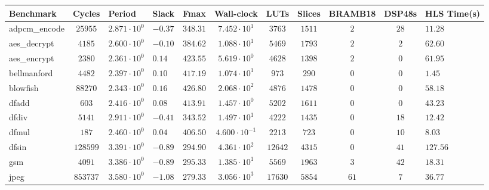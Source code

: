 \begin{tabular}{|l|c|HHc|c|c|c|c|cH|}
\hline
Benchmark     & Cycles       & Period                 & Slack     & Fmax       & Wall-clock              & LUTs      & Slices    & BRAMB18 & DSP48s  & HLS Time(s) \\
\hline
adpcm\_encode & $ 25955    $ & $ 2.871 \cdot 10^{0} $ & $ -0.37 $ & $ 348.31 $ & $ 7.452 \cdot 10^{1}  $ & $ 3763  $ & $ 1511  $ & $ 2   $ & $ 28  $ & $ 11.28   $ \\
aes\_decrypt  & $ 4185     $ & $ 2.600 \cdot 10^{0} $ & $ -0.10 $ & $ 384.62 $ & $ 1.088 \cdot 10^{1}  $ & $ 5469  $ & $ 1793  $ & $ 2   $ & $ 2   $ & $ 62.60   $ \\
aes\_encrypt  & $ 2380     $ & $ 2.361 \cdot 10^{0} $ & $ 0.14  $ & $ 423.55 $ & $ 5.619 \cdot 10^{0}  $ & $ 4628  $ & $ 1398  $ & $ 2   $ & $ 0   $ & $ 61.95   $ \\
bellmanford   & $ 4482     $ & $ 2.397 \cdot 10^{0} $ & $ 0.10  $ & $ 417.19 $ & $ 1.074 \cdot 10^{1}  $ & $ 973   $ & $ 290   $ & $ 0   $ & $ 0   $ & $ 1.45    $ \\
blowfish      & $ 88270    $ & $ 2.343 \cdot 10^{0} $ & $ 0.16  $ & $ 426.80 $ & $ 2.068 \cdot 10^{2}  $ & $ 4876  $ & $ 1478  $ & $ 0   $ & $ 0   $ & $ 58.18   $ \\
dfadd         & $ 603      $ & $ 2.416 \cdot 10^{0} $ & $ 0.08  $ & $ 413.91 $ & $ 1.457 \cdot 10^{0}  $ & $ 5202  $ & $ 1611  $ & $ 0   $ & $ 0   $ & $ 43.23   $ \\
dfdiv         & $ 5141     $ & $ 2.911 \cdot 10^{0} $ & $ -0.41 $ & $ 343.52 $ & $ 1.497 \cdot 10^{1}  $ & $ 4222  $ & $ 1435  $ & $ 0   $ & $ 18  $ & $ 12.42   $ \\
dfmul         & $ 187      $ & $ 2.460 \cdot 10^{0} $ & $ 0.04  $ & $ 406.50 $ & $ 4.600 \cdot 10^{-1} $ & $ 2213  $ & $ 723   $ & $ 0   $ & $ 10  $ & $ 8.03    $ \\
dfsin         & $ 128599   $ & $ 3.391 \cdot 10^{0} $ & $ -0.89 $ & $ 294.90 $ & $ 4.361 \cdot 10^{2}  $ & $ 12642 $ & $ 4315  $ & $ 0   $ & $ 41  $ & $ 127.56  $ \\
gsm           & $ 4091     $ & $ 3.386 \cdot 10^{0} $ & $ -0.89 $ & $ 295.33 $ & $ 1.385 \cdot 10^{1}  $ & $ 5569  $ & $ 1963  $ & $ 3   $ & $ 42  $ & $ 18.31   $ \\
jpeg          & $ 853737   $ & $ 3.580 \cdot 10^{0} $ & $ -1.08 $ & $ 279.33 $ & $ 3.056 \cdot 10^{3}  $ & $ 17630 $ & $ 5854  $ & $ 61  $ & $ 7   $ & $ 36.77   $ \\

\end{tabular}
